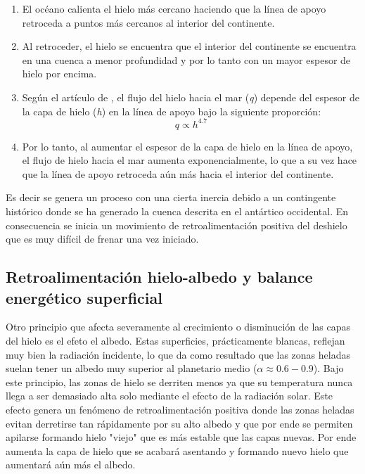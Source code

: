 \documentclass[12pt,a4paper,chapterprefix=false,headings=twolinechapter]{scrreprt}
\begin{document}
\begin{enumerate}
    \item El océano calienta el hielo más cercano haciendo que la línea de apoyo retroceda a puntos más cercanos al interior del continente.
    \item Al retroceder, el hielo se encuentra que el interior del continente se encuentra en una cuenca a menor profundidad y por lo tanto con un mayor espesor de hielo por encima. 
    \item Según el artículo de \cite{schoof2007ice}, el flujo del hielo hacia el mar (\textit{q}) depende del espesor de la capa de hielo (\textit{h}) en la línea de apoyo bajo la siguiente proporción: 
    \begin{equation}
        q \propto h^{4.7}
    \end{equation}
    \item Por lo tanto, al aumentar el espesor de la capa de hielo en la línea de apoyo, el flujo de hielo hacia el mar aumenta exponencialmente, lo que a su vez hace que la línea de apoyo retroceda aún más hacia el interior del continente.
\end{enumerate}

Es decir se genera un proceso con una cierta inercia debido a un contingente histórico donde se ha generado la cuenca descrita en el antártico occidental. En consecuencia se inicia un movimiento de retroalimentación positiva del deshielo que es 
muy difícil de frenar una vez iniciado. 

\newpage

\subsection{Retroalimentación hielo-albedo y balance energético superficial}

Otro principio que afecta severamente al crecimiento o disminución  de las capas del hielo es el efeto el albedo. Estas superficies, prácticamente blancas, reflejan muy bien la radiación incidente, lo que da como resultado 
que las zonas heladas suelan tener un albedo muy superior al planetario medio ($\alpha \approx 0.6-0.9$). Bajo este  principio, las zonas de hielo se derriten menos ya que su temperatura nunca llega a ser demasiado alta solo mediante el efecto de la radiación solar.
Este efecto genera un fenómeno de retroalimentación positiva donde las zonas heladas evitan derretirse tan rápidamente por su alto albedo y que por ende se permiten apilarse formando hielo "viejo" que es más estable que las capas nuevas. Por ende aumenta la capa de 
hielo que se acabará asentando y formando nuevo hielo que aumentará aún más el albedo. 
\end{document}
